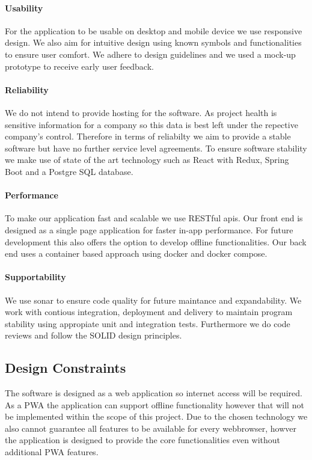 \paragraph*{Usability}
\label{sec:domainBca}
For the application to be usable on desktop and mobile device we use responsive design. We also aim for intuitive design using known symbols and functionalities to ensure user comfort. We adhere to design guidelines and we used a mock-up prototype to receive early user feedback.
\paragraph*{Reliability}
\label{sec:domainBcb}
We do not intend to provide hosting for the software. As project health is sensitive information for a company so this data is best left under the repective company's control. Therefore in terms of reliabilty we aim to provide a stable software but have no further service level agreements. To ensure software stability we make use of state of the art technology such as React with Redux, Spring Boot and a Postgre \acs{SQL} database.
\paragraph*{Performance}
\label{sec:domainBcc}
To make our application fast and scalable we use RESTful apis. Our front end is designed as a single page application for faster in-app performance. For future development this also offers the option to develop offline functionalities. Our back end uses a container based approach using docker and docker compose.
\paragraph*{Supportability}
\label{sec:domainBcd}
We use sonar to ensure code quality for future maintance and expandability. We work with contious integration, deployment and delivery to maintain program stability using appropiate unit and integration tests. Furthermore we do code reviews and follow the SOLID design principles.  

\subsection{Design Constraints}
\label{sec:domainBd}
The software is designed as a web application so internet access will be required. As a  \acs{PWA} the application can support offline functionality however that will not be implemented within the scope of this project. Due to the chosen technology we also cannot guarantee all features to be available for every webbrowser, howver the application is designed to provide the core functionalities even without additional  \acs{PWA} features.

